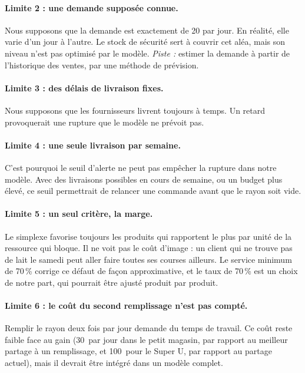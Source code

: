\documentclass[11pt,a4paper]{article}
\newcommand{\eur}{\,\text{€}}
\begin{document}
\paragraph{Limite 2 : une demande supposée connue.} Nous supposons que la demande est
exactement de 20 par jour. En réalité, elle varie d'un jour à l'autre. Le stock de sécurité sert
à couvrir cet aléa, mais son niveau n'est pas optimisé par le modèle. \emph{Piste :} estimer la
demande à partir de l'historique des ventes, par une méthode de prévision.

\paragraph{Limite 3 : des délais de livraison fixes.} Nous supposons que les fournisseurs
livrent toujours à temps. Un retard provoquerait une rupture que le modèle ne prévoit pas.

\paragraph{Limite 4 : une seule livraison par semaine.} C'est pourquoi le seuil d'alerte ne
peut pas empêcher la rupture dans notre modèle. Avec des livraisons possibles en cours de
semaine, ou un budget plus élevé, ce seuil permettrait de relancer une commande avant que le
rayon soit vide.

\paragraph{Limite 5 : un seul critère, la marge.} Le simplexe favorise toujours les produits
qui rapportent le plus par unité de la ressource qui bloque. Il ne voit pas le coût d'image :
un client qui ne trouve pas de lait le samedi peut aller faire toutes ses courses ailleurs. Le
service minimum de 70\,\% corrige ce défaut de façon approximative, et le taux de 70\,\% est un
choix de notre part, qui pourrait être ajusté produit par produit.

\paragraph{Limite 6 : le coût du second remplissage n'est pas compté.} Remplir le rayon deux
fois par jour demande du temps de travail. Ce coût reste faible face au gain (30\eur{} par jour
dans le petit magasin, par rapport au meilleur partage à un remplissage, et 100\eur{} pour le
Super U, par rapport au partage actuel), mais il devrait être intégré dans un modèle complet.
\end{document}
